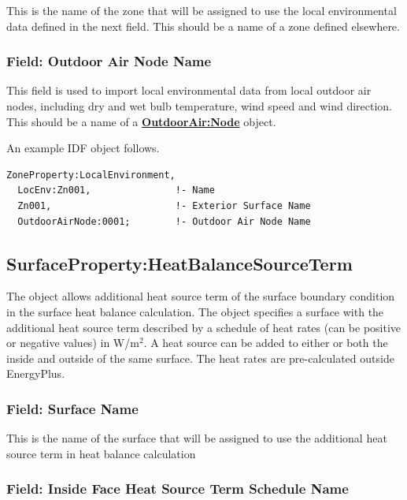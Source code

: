 This is the name of the zone that will be assigned to use the local environmental data defined in the next field. This should be a name of a zone defined elsewhere.

\subsubsection{Field: Outdoor Air Node Name}\label{field-zone-outdoor-air-node-name}

This field is used to import local environmental data from local outdoor air nodes, including dry and wet bulb temperature, wind speed and wind direction. This should be a name of a \textbf{\hyperref[outdoorairnode]{OutdoorAir:Node}} object.

An example IDF object follows.

\begin{lstlisting}
ZoneProperty:LocalEnvironment,
  LocEnv:Zn001,               !- Name
  Zn001,                      !- Exterior Surface Name
  OutdoorAirNode:0001;        !- Outdoor Air Node Name
\end{lstlisting}

\subsection{SurfaceProperty:HeatBalanceSourceTerm}\label{surfacePropertyHeatBalanceSourceTerm}

The object allows additional heat source term of the surface boundary condition in the surface heat balance calculation. The object specifies a surface with the additional heat source term described by a schedule of heat rates (can be positive or negative values) in W/m\(^2\). A heat source can be added	to either or both the inside and outside of the same surface. The heat rates are pre-calculated outside EnergyPlus.

\subsubsection{Field: Surface Name}\label{surfacePropertyHeatBalanceSourceTerm-field-surface-name}

This is the name of the surface that will be assigned to use the additional heat source term in heat balance calculation

\subsubsection{Field: Inside Face Heat Source Term Schedule Name}\label{field-inside-heat-source-term-schedule-name}

